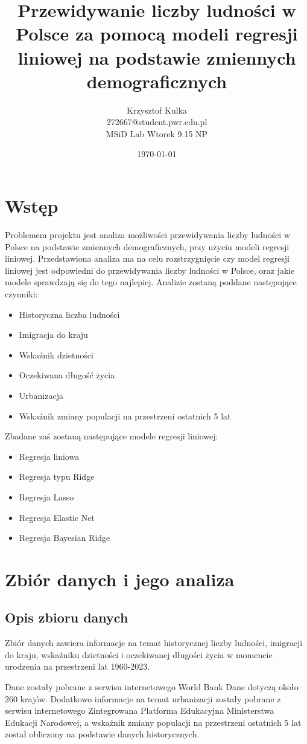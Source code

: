 \documentclass[11pt]{article}
\title{ Przewidywanie liczby ludności w Polsce za pomocą modeli regresji liniowej na podstawie zmiennych demograficznych}
\author{ Krzysztof Kulka
        \\ 272667@student.pwr.edu.pl \\ MSiD Lab Wtorek 9.15 NP }
\date{\today}
\begin{document}
\maketitle	
\pagebreak

\setcounter{tocdepth}{4}
\setcounter{secnumdepth}{4}
\tableofcontents
 \pagebreak


\section{Wstęp}
Problemem projektu jest analiza możliwości przewidywania liczby ludności w Polsce na podstawie zmiennych demograficznych, przy użyciu modeli regresji liniowej.
Przedstawiona analiza ma na celu rozstrzygnięcie czy model regresji liniowej jest odpowiedni do przewidywania liczby ludności w Polsce, oraz jakie modele sprawdzają się do tego najlepiej.
Analizie zostaną poddane następujące czynniki:
\begin{itemize}
\item Historyczna liczba ludności
\item Imigracja do kraju
\item Wskaźnik dzietności
\item Oczekiwana długość życia
\item Urbanizacja
\item Wskaźnik zmiany populacji na przestrzeni ostatnich 5 lat
\end{itemize}
Zbadane zaś zostaną następujące modele regresji liniowej:
\begin{itemize}
\item Regresja liniowa
\item Regresja typu Ridge
\item Regresja Lasso
\item Regresja Elastic Net
\item Regresja Bayesian Ridge
\end{itemize}
\section{Zbiór danych i jego analiza}
\subsection{Opis zbioru danych}
Zbiór danych zawiera informacje na temat historycznej liczby ludności, imigracji do kraju, wskaźniku dzietności i oczekiwanej
długości życia w momencie urodzenia na przestrzeni lat 1960-2023.\par
Dane zostały pobrane z serwisu internetowego World Bank\cite{wbd} Dane dotyczą około 260 krajów. 
Dodatkowo informacje na temat urbanizacji
zostały pobrane z serwisu internetowego Zintegrowana Platforma Edukacyjna Ministerstwa Edukacji Narodowej\cite{zpe}, a wskaźnik zmiany populacji na przestrzeni ostatnich 5 lat został obliczony na podstawie danych historycznych.
\end{document}
